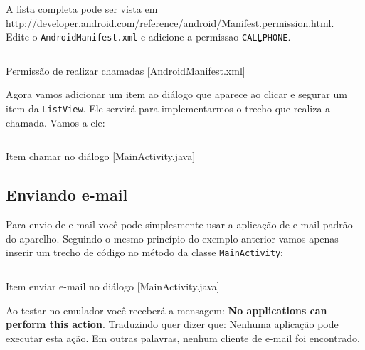 A lista completa pode ser vista em 
\url{http://developer.android.com/reference/android/Manifest.permission.html}.\\

Edite o \texttt{AndroidManifest.xml} e adicione a permissao \texttt{CALL\b{ }PHONE}.

\begin{listing}[H]
  \inputminted[linenos=true,frame=bottomline,tabsize=3]{ xml }{ source/AndroidManifest-3.xml }
  \caption{Permissão de realizar chamadas [AndroidManifest.xml]}
\end{listing}

Agora vamos adicionar um item ao diálogo que aparece ao clicar e segurar um item da \texttt{ListView}.
Ele servirá para implementarmos o trecho que realiza a chamada. Vamos a ele:

\begin{listing}[H]
  \inputminted[linenos=true,frame=bottomline,tabsize=3]{ java }{ source/MainActivity-10.java }
  \caption{Item chamar no diálogo [MainActivity.java]}
\end{listing}

\newpage

\subsection{Enviando e-mail}

Para envio de e-mail você pode simplesmente usar a aplicação de e-mail padrão do aparelho.
Seguindo o mesmo princípio do exemplo anterior vamos apenas inserir um trecho de código
no método  da classe \texttt{MainActivity}:

\begin{listing}[H]
  \inputminted[linenos=true,frame=bottomline,tabsize=3]{ java }{ source/MainActivity-11.java }
  \caption{Item enviar e-mail no diálogo [MainActivity.java]}
\end{listing}

Ao testar no emulador você receberá a mensagem: \textbf{No applications can perform this action}. Traduzindo
quer dizer que: Nenhuma aplicação pode executar esta ação. Em outras palavras, nenhum cliente de e-mail
foi encontrado.
 
%  
% 
% 
% 

